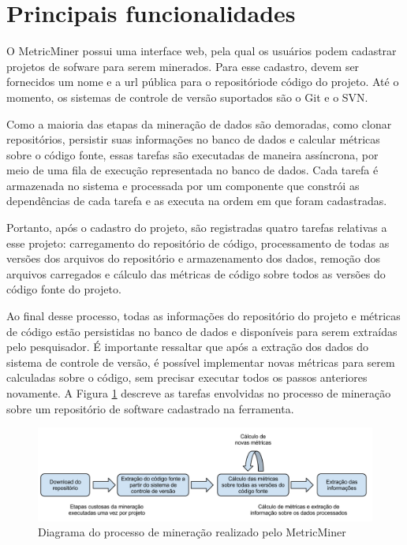 \documentclass[a4paper, 12pt, twoside]{book}
\begin{document}
    
    \section{Principais funcionalidades} \label{sc:abordagem}
        O MetricMiner possui uma interface web, pela qual os usuários podem cadastrar projetos de
        sofware para serem minerados. Para esse cadastro, devem ser fornecidos um nome e a url
        pública para o repositóriode código do projeto. Até o momento, os sistemas de controle de versão 
        suportados são o Git e o SVN.

        Como a maioria das etapas da mineração de dados são demoradas, como
        clonar repositórios, persistir suas informações no banco de dados e calcular métricas sobre o
        código fonte, essas tarefas são executadas de maneira assíncrona, por meio 
        de uma fila de execução representada no banco de dados. Cada tarefa é armazenada no sistema e 
        processada por um componente que constrói as dependências de cada tarefa e as executa na 
        ordem em que foram cadastradas.

        Portanto, após o cadastro do projeto, são registradas quatro tarefas relativas a esse 
        projeto: carregamento do repositório de código, processamento de todas as versões
        dos arquivos do repositório e armazenamento dos dados,
        remoção dos arquivos carregados e cálculo das métricas de código sobre todos
        as versões do código fonte do projeto.

        Ao final desse processo, todas as informações do repositório do projeto e métricas de código estão persistidas no banco de dados e disponíveis para serem extraídas pelo pesquisador. É importante ressaltar que após a extração dos dados do sistema de controle de versão, é possível implementar novas métricas para serem calculadas sobre o código, sem precisar executar todos os passos anteriores novamente. A Figura \ref{fig:diagrama} descreve as tarefas envolvidas no processo de mineração sobre um repositório de software cadastrado na ferramenta.

        \begin{figure}[ht]
            \centering
            \includegraphics[width=1.0\textwidth]{img/diagrama.png}
            \caption{Diagrama do processo de mineração realizado pelo MetricMiner}
            \label{fig:diagrama}
        \end{figure}
\end{document}

